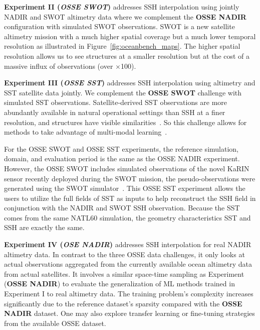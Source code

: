 \textbf{Experiment II (\textit{OSSE SWOT})} addresses SSH interpolation using jointly NADIR and SWOT altimetry data where we complement the \textbf{OSSE NADIR} configuration with simulated SWOT observations.
SWOT is a new satellite altimetry mission with a much higher spatial coverage but a much lower temporal resolution as illustrated in Figure~\ref{fig:oceanbench_maps}.
The higher spatial resolution allows us to see structures at a smaller resolution but at the cost of a massive influx of observations (over $\times$100).

\textbf{Experiment III (\textit{OSSE SST})} addresses SSH interpolation using altimetry and SST satellite data jointly. We complement the \textbf{OSSE SWOT} challenge with simulated SST observations. 
Satellite-derived SST observations are more abundantly available in natural operational settings than SSH at a finer resolution, and structures have visible similarities~\cite{SWOT,BFNQG}.
So this challenge allows for methods to take advantage of multi-modal learning~\cite{4DVARNETSST,SSHInterpAttention}.

For the OSSE SWOT and OSSE SST experiments, the reference simulation, domain, and evaluation period is the same as the OSSE NADIR experiment.
However, the OSSE SWOT includes simulated observations of the novel KaRIN sensor recently deployed during the SWOT mission, the pseudo-observations were generated using the SWOT simulator~\cite{SWOT}. 
This OSSE SST experiment allows the users to utilize the full fields of SST as inputs to help reconstruct the SSH field in conjunction with the NADIR and SWOT SSH observation.
Because the SST comes from the same NATL60 simulation, the geometry characteristics SST and SSH are exactly the same.


\textbf{Experiment IV (\textit{OSE NADIR})} addresses SSH interpolation for real NADIR altimetry data. 
In contrast to the three OSSE data challenges, it only looks at actual observations aggregated from the currently available ocean altimetry data from actual satellites. 
It involves a similar space-time sampling as Experiment (\textbf{OSSE NADIR}) to evaluate the generalization of ML methods trained in Experiment I to real altimetry data. 
The training problem's complexity increases significantly due to the reference dataset's sparsity compared with the \textbf{OSSE NADIR} dataset. 
One may also explore transfer learning or fine-tuning strategies from the available OSSE dataset. 


